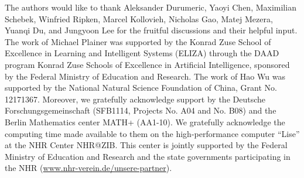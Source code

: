 \begin{ack}
The authors would like to thank  Aleksander Durumeric, Yaoyi Chen, Maximilian Schebek, Winfried Ripken, Marcel Kollovieh, Nicholas Gao, Matej Mezera,  Yuanqi Du, and Jungyoon Lee for the fruitful discussions and their helpful input. 
%
The work of Michael Plainer was supported by the Konrad Zuse School of Excellence in Learning and Intelligent Systems (ELIZA) through the DAAD program Konrad Zuse Schools of Excellence in Artificial Intelligence, sponsored by the Federal Ministry of Education and Research. The work of Hao Wu was supported by the National Natural Science Foundation of China, Grant No. 12171367.
Moreover, we gratefully acknowledge support by the Deutsche Forschungsgemeinschaft (SFB1114, Projects No. A04 and No. B08) and the Berlin Mathematics center MATH+ (AA1-10).
We gratefully acknowledge the computing time made available to them on the high-performance computer \enquote{Lise} at the NHR Center NHR@ZIB. This center is jointly supported by the Federal Ministry of Education and Research and the state governments participating in the NHR (\url{www.nhr-verein.de/unsere-partner}). 
\end{ack}
